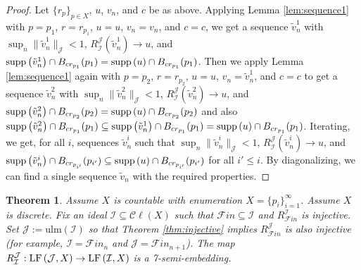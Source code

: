 \documentclass[12pt]{amsart}
\newtheorem{theorem}{Theorem}[section]
\theoremstyle{definition}
\numberwithin{equation}{section}
\def \F {\mathcal{F}in}
\def \I {\mathcal{I}}
\def \J {\mathcal{J}}
\def \sbs {\subseteq}
\newcommand{\Cl}[1]{\mathcal{C}\ell\left(#1\right)}
\newcommand{\ulm}[1]{\mathrm{ulm}\left(#1\right)}
\begin{document}
\begin{proof}
Let $\{r_p\}_{p \in X}$, $u$, $v_n$, and $c$ be as above. Applying Lemma \ref{lem:sequence1} with $p = p_1$, $r = r_{p_1}$, $u = u$, $v_n = v_n$, and $c = c$, we get a sequence $\tilde{v}_n^1$ with $\sup_n \|\tilde{v}_n^1\|_\J < 1$, $R^\J_\I(\tilde{v}_n^1) \to u$, and $\supp{\tilde{v}_n^1} \cap B_{cr_{p_{1}}}(p_{1}) = \supp{u} \cap B_{cr_{p_{1}}}(p_{1})$. Then we apply Lemma \ref{lem:sequence1} again with $p = p_2$, $r = r_{p_2}$, $u = u$, $v_n = \tilde{v}_n^1$, and $c=c$ to get a sequence $\tilde{v}_n^2$ with $\sup_n \|\tilde{v}_n^2\|_\J < 1$, $R^\J_\I(\tilde{v}_n^2) \to u$, and $\supp{\tilde{v}_n^2} \cap B_{cr_{p_{2}}}(p_{2}) = \supp{u} \cap B_{cr_{p_{2}}}(p_{2})$ and also $\supp{\tilde{v}_n^2} \cap B_{cr_{p_{1}}}(p_{1}) \sbs \supp{\tilde{v}_n^1} \cap B_{cr_{p_{1}}}(p_{1}) = \supp{u} \cap B_{cr_{p_{1}}}(p_{1})$. Iterating, we get, for all $i$, sequences $\tilde{v}_n^i$ such that $\sup_n \|\tilde{v}_n^i\|_\J < 1$, $R^\J_\I(\tilde{v}_n^i) \to u$, and $\supp{\tilde{v}_n^i} \cap B_{cr_{p_{i'}}}(p_{i'}) \sbs \supp{u} \cap B_{cr_{p_{i'}}}(p_{i'})$ for all $i' \leq i$. By diagonalizing, we can find a single sequence $\tilde{v}_n$ with the required properties. 
\end{proof}

\begin{theorem} \label{thm:semiembedding}
Assume $X$ is countable with enumeration $X = \{p_i\}_{i=1}^\infty$. Assume $X$ is discrete. Fix an ideal $\I \sbs \Cl{X}$ such that $\F \sbs \I$ and $R^\I_{\F}$ is injective. Set $\J := \ulm{\I}$ so that Theorem \ref{thm:injective} implies $R^\J_{\F}$ is also injective (for example, $\I = \F_n$ and $\J = \F_{n+1}$). The map $R^{\J}_\I: \LF{\J,X} \to \LF{\I}{X}$ is a 7-semi-embedding.
\end{theorem}
\end{document}
